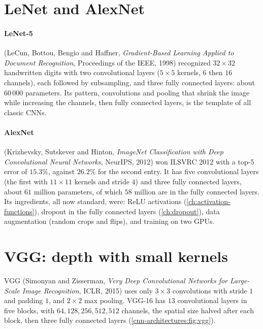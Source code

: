 \begin{notechapter}
\section{LeNet and AlexNet}\label{cnn-architectures:sec:alexnet}

\paragraph{LeNet-5} (LeCun, Bottou, Bengio and Haffner, \emph{Gradient-Based Learning
Applied to Document Recognition}, Proceedings of the IEEE, 1998) recognized $32\times32$
handwritten digits with two convolutional layers ($5\times5$ kernels, $6$ then $16$ channels), each followed
by subsampling, and three fully connected layers: about $60\,000$ parameters. Its pattern,
convolutions and pooling that shrink the image while increasing the channels, then fully
connected layers, is the template of all classic CNNs.

\paragraph{AlexNet} (Krizhevsky, Sutskever and Hinton, \emph{ImageNet Classification with
Deep Convolutional Neural Networks}, NeurIPS, 2012) won ILSVRC 2012 with a top-5 error of
$15.3\%$, against $26.2\%$ for the second entry. It has five convolutional layers (the first with $11\times11$
kernels and stride $4$) and three fully connected layers, about $61$ million parameters, of which
$58$ million are in the fully connected layers. Its ingredients, all now standard, were: ReLU
activations (\cref{ch:activation-functions}), dropout in the fully connected layers
(\cref{ch:dropout}), data augmentation (random crops and flips), and training on two
GPUs.

\section{VGG: depth with small kernels}\label{cnn-architectures:sec:vgg}

VGG (Simonyan and Zisserman, \emph{Very Deep Convolutional Networks for Large-Scale Image
Recognition}, ICLR, 2015) uses only $3\times3$ convolutions with stride $1$ and padding $1$, and $2\times2$ max pooling.
VGG-16 has $13$ convolutional layers in five blocks, with $64, 128, 256, 512, 512$ channels, the
spatial size halved after each block, then three fully connected layers
(\cref{cnn-architectures:fig:vgg}).


\end{notechapter}
